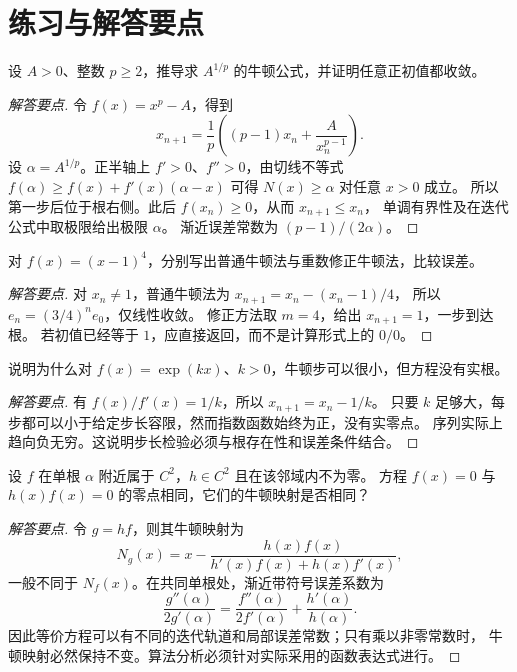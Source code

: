 \documentclass[UTF8,12pt,a4paper,fontset=fandol]{ctexart}
\begin{document}
\section{练习与解答要点}
\label{sec:newton-exercises}

\begin{example}[正数的高次方根]
设 $A>0$、整数 $p\ge2$，推导求 $A^{1/p}$ 的牛顿公式，并证明任意正初值都收敛。
\end{example}
\begin{proof}[解答要点]
令 $f(x)=x^p-A$，得到
\[
  x_{n+1}=\frac1p\left((p-1)x_n+\frac{A}{x_n^{p-1}}\right).
\]
设 $\alpha=A^{1/p}$。正半轴上 $f'>0$、$f''>0$，由切线不等式
$f(\alpha)\ge f(x)+f'(x)(\alpha-x)$ 可得 $N(x)\ge\alpha$ 对任意 $x>0$ 成立。
所以第一步后位于根右侧。此后 $f(x_n)\ge0$，从而 $x_{n+1}\le x_n$，
单调有界性及在迭代公式中取极限给出极限 $\alpha$。
渐近误差常数为 $(p-1)/(2\alpha)$。
\end{proof}

\begin{example}[判断重根对精度的影响]
对 $f(x)=(x-1)^4$，分别写出普通牛顿法与重数修正牛顿法，比较误差。
\end{example}
\begin{proof}[解答要点]
对 $x_n\ne1$，普通牛顿法为 $x_{n+1}=x_n-(x_n-1)/4$，
所以 $e_n=(3/4)^ne_0$，仅线性收敛。
修正方法取 $m=4$，给出 $x_{n+1}=1$，一步到达根。
若初值已经等于 $1$，应直接返回，而不是计算形式上的 $0/0$。
\end{proof}

\begin{example}[小步长不能独立认证精度]
说明为什么对 $f(x)=\exp(kx)$、$k>0$，牛顿步可以很小，但方程没有实根。
\end{example}
\begin{proof}[解答要点]
有 $f(x)/f'(x)=1/k$，所以 $x_{n+1}=x_n-1/k$。
只要 $k$ 足够大，每步都可以小于给定步长容限，然而指数函数始终为正，没有实零点。
序列实际上趋向负无穷。这说明步长检验必须与根存在性和误差条件结合。
\end{proof}

\begin{example}[方程表示会改变牛顿映射]
设 $f$ 在单根 $\alpha$ 附近属于 $C^2$，$h\in C^2$ 且在该邻域内不为零。
方程 $f(x)=0$ 与 $h(x)f(x)=0$ 的零点相同，它们的牛顿映射是否相同？
\end{example}
\begin{proof}[解答要点]
令 $g=hf$，则其牛顿映射为
\[
  N_g(x)=x-\frac{h(x)f(x)}{h'(x)f(x)+h(x)f'(x)},
\]
一般不同于 $N_f(x)$。在共同单根处，渐近带符号误差系数为
\[
  \frac{g''(\alpha)}{2g'(\alpha)}
  =\frac{f''(\alpha)}{2f'(\alpha)}+\frac{h'(\alpha)}{h(\alpha)}.
\]
因此等价方程可以有不同的迭代轨道和局部误差常数；只有乘以非零常数时，
牛顿映射必然保持不变。算法分析必须针对实际采用的函数表达式进行。
\end{proof}
\end{document}
